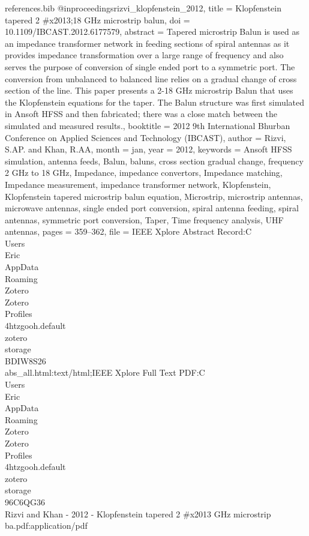 \begin{filecontents*}{references.bib}
@inproceedings{rizvi_klopfenstein_2012,
	title = {Klopfenstein tapered 2 \#x2013;18 {GHz} microstrip balun},
	doi = {10.1109/IBCAST.2012.6177579},
	abstract = {Tapered microstrip Balun is used as an impedance transformer network in feeding sections of spiral antennas as it provides impedance transformation over a large range of frequency and also serves the purpose of conversion of single ended port to a symmetric port. The conversion from unbalanced to balanced line relies on a gradual change of cross section of the line. This paper presents a 2-18 {GHz} microstrip Balun that uses the Klopfenstein equations for the taper. The Balun structure was first simulated in Ansoft {HFSS} and then fabricated; there was a close match between the simulated and measured results.},
	booktitle = {2012 9th International Bhurban Conference on Applied Sciences and Technology ({IBCAST})},
	author = {Rizvi, S.AP. and Khan, R.AA},
	month = jan,
	year = {2012},
	keywords = {Ansoft {HFSS} simulation, antenna feeds, Balun, baluns, cross section gradual change, frequency 2 {GHz} to 18 {GHz}, Impedance, impedance convertors, Impedance matching, Impedance measurement, impedance transformer network, Klopfenstein, Klopfenstein tapered microstrip balun equation, Microstrip, microstrip antennas, microwave antennas, single ended port conversion, spiral antenna feeding, spiral antennas, symmetric port conversion, Taper, Time frequency analysis, {UHF} antennas},
	pages = {359--362},
	file = {IEEE Xplore Abstract Record:C\:\\Users\\Eric\\AppData\\Roaming\\Zotero\\Zotero\\Profiles\\4htzgooh.default\\zotero\\storage\\BDIW8S26\\abs_all.html:text/html;IEEE Xplore Full Text PDF:C\:\\Users\\Eric\\AppData\\Roaming\\Zotero\\Zotero\\Profiles\\4htzgooh.default\\zotero\\storage\\96C6QG36\\Rizvi and Khan - 2012 - Klopfenstein tapered 2 #x2013 GHz microstrip ba.pdf:application/pdf}
}


\end{filecontents*}
